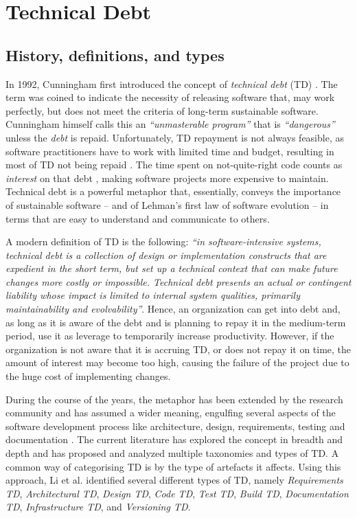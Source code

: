 \section{Technical Debt}
\subsection{History, definitions, and types}
In 1992, Cunningham first introduced the concept of \emph{technical debt} (TD) \cite{Cunningham1992}. 
The term was coined to indicate the necessity of releasing software that, may work perfectly, but does not meet the criteria of long-term sustainable software. 
Cunningham himself calls this an \emph{``unmasterable program''} that is \emph{``dangerous''} unless the \emph{debt} is repaid.
Unfortunately, TD repayment is not always feasible, as software practitioners have to work with limited time and budget, resulting in most of TD not being repaid \cite{Digkas2018}.
The time spent on not-quite-right code counts as \emph{interest} on that debt \cite{Cunningham1992}, making software projects more expensive to maintain.
Technical debt is a powerful metaphor that, essentially, conveys the importance of sustainable software -- and of Lehman's first law of software evolution -- in terms that are easy to understand and communicate to others. 


A modern definition of TD is the following: 
\emph{``in software-intensive systems, technical debt is a collection of design or implementation constructs that are expedient in the short term, but set up a technical context that can make future changes more costly or impossible. Technical debt presents an actual or contingent liability whose impact is limited to internal system qualities, primarily maintainability and evolvability''}\cite{Avgeriou2016}. 
Hence, an organization can get into debt and, as long as it is aware of the debt and is planning to repay it in the medium-term period, use it as leverage to temporarily increase productivity.
However, if the organization is not aware that it is accruing TD, or does not repay it on time, the amount of interest may become too high, causing the failure of the project due to the huge cost of implementing changes.

During the course of the years, the metaphor has been extended by the research community and has assumed a wider meaning, engulfing several aspects of the software development process like architecture, design, requirements, testing and documentation \cite{Brown2010}.
The current literature has explored the concept in breadth and depth and has proposed and analyzed multiple taxonomies and types of TD.
A common way of categorising TD is by the type of artefacts it affects. Using this approach, Li et al. \cite{Li2015} identified several different types of TD, namely \emph{Requirements TD}, \emph{Architectural TD}, \emph{Design TD}, \emph{Code TD}, \emph{Test TD}, \emph{Build TD}, \emph{Documentation TD}, \emph{Infrastructure TD}, and \emph{Versioning TD}.

